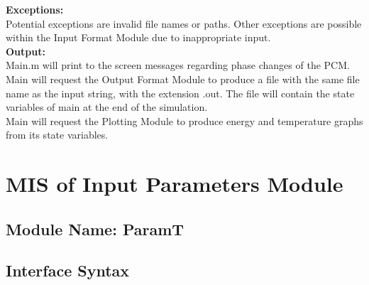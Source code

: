 \documentclass[12pt]{article}
\begin{document}
\noindent \textbf{Exceptions:}\\
Potential exceptions are invalid file names or paths. Other exceptions are possible within the Input Format Module due to inappropriate input.\\

\noindent \textbf{Output:}\\
Main.m will print to the screen messages regarding phase changes of the PCM.\\
Main will request the Output Format Module to produce a file with the  same file
name as the input string, with the extension .out. The file will contain the 
state variables of main at the end of the simulation.\\
Main will request the Plotting Module to produce energy and temperature graphs
from its state variables.


\section{MIS of Input Parameters Module}

\subsection{Module Name: ParamT} %





\subsection{Interface Syntax}
\end{document}
